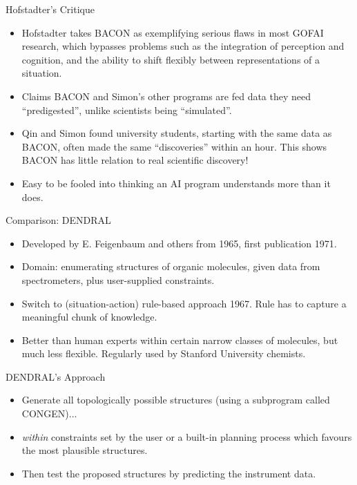 \documentclass{article}
\begin{document}
\begin{slide}{}
{\Large Hofstadter's Critique}
\begin{itemize}
\item Hofstadter takes BACON as exemplifying
serious flaws in most GOFAI research, which bypasses problems
such as the integration of perception and cognition, and the ability to
shift flexibly between representations of a situation.
\item Claims BACON and Simon's other programs are fed data they
need ``predigested'', unlike scientists being ``simulated''.
\item Qin and Simon found university students, starting with the same
data as BACON, often made the same ``discoveries''  within an
hour. This shows BACON has little 
relation to real scientific discovery! 
\item Easy to be fooled into thinking an AI program
understands more than it does.
\end{itemize}
\end{slide}

\begin{slide}
{\Large Comparison: DENDRAL}
\begin{itemize}
\item Developed by E. Feigenbaum and others from 1965, first publication 1971.
\item Domain: enumerating structures of organic molecules, given data
from spectrometers, plus user-supplied constraints.
\item Switch to (situation-action) rule-based approach 1967. Rule has
to capture a meaningful chunk of knowledge.
\item Better than human experts within certain narrow classes of molecules,
but much less flexible. 
Regularly used by Stanford University chemists.
\end{itemize}
\end{slide}

\begin{slide}
{\Large DENDRAL's Approach}
\begin{itemize}
\item Generate all topologically
possible
structures (using a subprogram called CONGEN)...
\item {\em within} constraints set by the user or a built-in planning
process which favours the most plausible structures.
\item Then test the proposed structures
by predicting the instrument data.
\end{itemize}
\end{slide}
\end{document}
